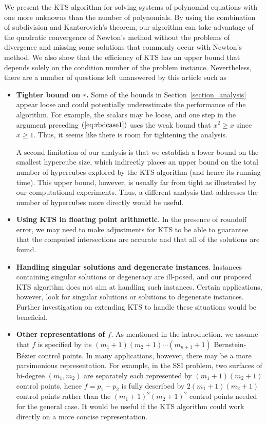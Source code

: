 \documentclass{article}
\newcommand\eref[1]{$(\ref{#1})$}
\begin{document}
We present the KTS algorithm for solving systems of polynomial equations with one more unknowns than the number of polynomials.  By using the combination of subdivision and Kantorovich's theorem, our algorithm can take advantage of the
quadratic convergence of Newton's method without the problems of
divergence and missing some solutions that commonly occur with
Newton's method. We also show that the efficiency of KTS has an
upper bound that depends solely on the condition number of the
problem instance.  Nevertheless, there are a number of questions left
unanswered by this article such as
\begin{itemize}
\item \textbf{Tighter bound on $r$.}
Some of the bounds in Section~\ref{section_analysis} appear
loose and could potentially underestimate the performance
of the algorithm.  For example, the scalars may be loose,
and one step in the argument preceding \eref{eq:rbdcase1}
uses the weak bound that $x^2\ge x$ since $x\ge 1$.  Thus, it
seems like there is room for tightening the analysis.  

A second
limitation of our analysis is that we establish a lower bound on
the smallest hypercube size, which indirectly places an upper bound on
the total number of hypercubes explored by the KTS algorithm (and hence its
running time).  This
upper bound, however, is usually far from tight as illustrated by
our computational experiments.  Thus, a different analysis that
addresses the number of hypercubes more directly would be useful.

\item \textbf{Using KTS in floating point arithmetic}. In the
presence of roundoff error, we may need to make adjustments for
KTS to be able to guarantee that the computed intersections are
accurate and that all of the solutions are found.

\item \textbf{Handling singular solutions and degenerate instances}.  Instances containing singular solutions or degeneracy are ill-posed, and our proposed KTS algorithm does not aim at handling such instances.  Certain applications, however, look for singular solutions or solutions to degenerate instances.  Further investigation on extending KTS to handle these situations would be beneficial.

\item \textbf{Other representations of $f$}.  As mentioned in the introduction, we
assume that $f$ is specified  by its $(m_1+1)(m_2+1)\cdots (m_{n+1}+1)$ 
Bernstein-B\'ezier control
points.  In many applications, however, there may be a more parsimonious representation.
For example, in the SSI problem, two surfaces of bi-degree $(m_1,m_2)$
are separately each represented by
$(m_1+1)(m_2+1)$ control points, hence $f=p_1-p_2$ is fully described
by $2(m_1+1)(m_2+1)$ control points rather than the
$(m_1+1)^2(m_2+1)^2$ control points needed for the general case.
It would be useful if the KTS algorithm could work 
directly on a more concise representation.



\end{itemize}
\end{document}
